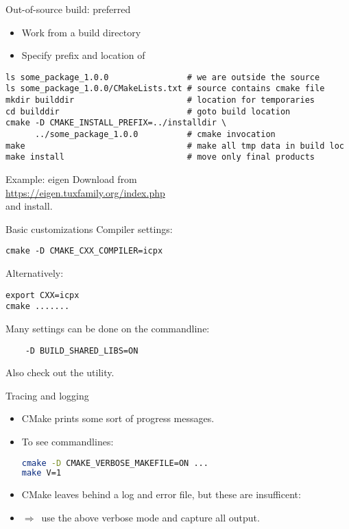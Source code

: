 \begin{numberedframe}{Out-of-source build: preferred}
  \begin{itemize}
  \item Work from a build directory
  \item Specify prefix and location of 
  \end{itemize}
\lstset{numbers=left,numberstyle=\tiny}
\begin{lstlisting}
ls some_package_1.0.0                # we are outside the source
ls some_package_1.0.0/CMakeLists.txt # source contains cmake file
mkdir builddir                       # location for temporaries
cd builddir                          # goto build location
cmake -D CMAKE_INSTALL_PREFIX=../installdir \
      ../some_package_1.0.0          # cmake invocation
make                                 # make all tmp data in build loc
make install                         # move only final products
\end{lstlisting}
\end{numberedframe}

\begin{numberedframe}{Example: eigen}
  Download from\\
  \url{https://eigen.tuxfamily.org/index.php}\\
  and install.
\end{numberedframe}

\begin{numberedframe}{Basic customizations}
  Compiler settings:
\begin{lstlisting}
cmake -D CMAKE_CXX_COMPILER=icpx
\end{lstlisting}
Alternatively:
\begin{lstlisting}
export CXX=icpx
cmake .......
\end{lstlisting}
Many settings can be done on the commandline:
\begin{lstlisting}
    -D BUILD_SHARED_LIBS=ON
\end{lstlisting}
Also check out the  utility.
\end{numberedframe}

\begin{numberedframe}{Tracing and logging}
  \begin{itemize}
  \item CMake prints some sort of progress messages.
  \item To see commandlines:
\begin{lstlisting}[language=bash]
cmake -D CMAKE_VERBOSE_MAKEFILE=ON ...
make V=1
\end{lstlisting}
\item CMake leaves behind a log and error file, but these are insufficent:
  \item $\Rightarrow$~use the above verbose mode and capture all output.
  \end{itemize}
\end{numberedframe}
